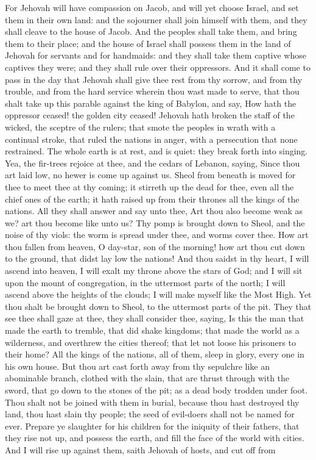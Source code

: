 For Jehovah will have compassion on Jacob, and will yet choose Israel, and set them in their own land: and the sojourner shall join himself with them, and they shall cleave to the house of Jacob. And the peoples shall take them, and bring them to their place; and the house of Israel shall possess them in the land of Jehovah for servants and for handmaids: and they shall take them captive whose captives they were; and they shall rule over their oppressors.  And it shall come to pass in the day that Jehovah shall give thee rest from thy sorrow, and from thy trouble, and from the hard service wherein thou wast made to serve, that thou shalt take up this parable against the king of Babylon, and say, How hath the oppressor ceased! the golden city ceased! Jehovah hath broken the staff of the wicked, the sceptre of the rulers; that smote the peoples in wrath with a continual stroke, that ruled the nations in anger, with a persecution that none restrained. The whole earth is at rest, and is quiet: they break forth into singing. Yea, the fir-trees rejoice at thee, and the cedars of Lebanon, saying, Since thou art laid low, no hewer is come up against us. Sheol from beneath is moved for thee to meet thee at thy coming; it stirreth up the dead for thee, even all the chief ones of the earth; it hath raised up from their thrones all the kings of the nations. All they shall answer and say unto thee, Art thou also become weak as we? art thou become like unto us? Thy pomp is brought down to Sheol, and the noise of thy viols: the worm is spread under thee, and worms cover thee.  How art thou fallen from heaven, O day-star, son of the morning! how art thou cut down to the ground, that didst lay low the nations! And thou saidst in thy heart, I will ascend into heaven, I will exalt my throne above the stars of God; and I will sit upon the mount of congregation, in the uttermost parts of the north; I will ascend above the heights of the clouds; I will make myself like the Most High. Yet thou shalt be brought down to Sheol, to the uttermost parts of the pit. They that see thee shall gaze at thee, they shall consider thee, saying, Is this the man that made the earth to tremble, that did shake kingdoms; that made the world as a wilderness, and overthrew the cities thereof; that let not loose his prisoners to their home? All the kings of the nations, all of them, sleep in glory, every one in his own house. But thou art cast forth away from thy sepulchre like an abominable branch, clothed with the slain, that are thrust through with the sword, that go down to the stones of the pit; as a dead body trodden under foot. Thou shalt not be joined with them in burial, because thou hast destroyed thy land, thou hast slain thy people; the seed of evil-doers shall not be named for ever.  Prepare ye slaughter for his children for the iniquity of their fathers, that they rise not up, and possess the earth, and fill the face of the world with cities. And I will rise up against them, saith Jehovah of hosts, and cut off from 